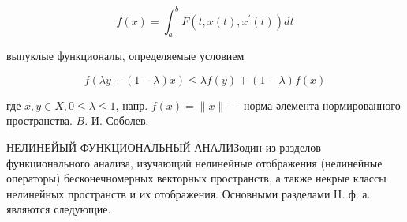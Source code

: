 \documentclass[10pt]{article}
\begin{document}
\[

f(x)=\int_{a}^{b} F\left(t, x(t), x^{\prime}(t)\right) d t

\]



выпуклые функционалы, определяемые условием



\[

f(\lambda y+(1-\lambda) x) \leqslant \lambda f(y)+(1-\lambda) f(x)

\]



где $x, y \in X, 0 \leqslant \lambda \leqslant 1$, напр. $f(x)=\|x\|-$ норма әлемента нормированного пространства. $B$. И. Соболев.



НЕЛИНЕЙЫЙ ФУНКЦИОНАЛЬНЫЙ АНАЛИЗодин из разделов функционального анализа, изучающий нелинейные отображения (нелинейные операторы) бесконечномерных векторных пространств, а также некрые классы нелинейных пространств и их отображения. Основными разделами Н. ф. а. являются следующие.
\end{document}
